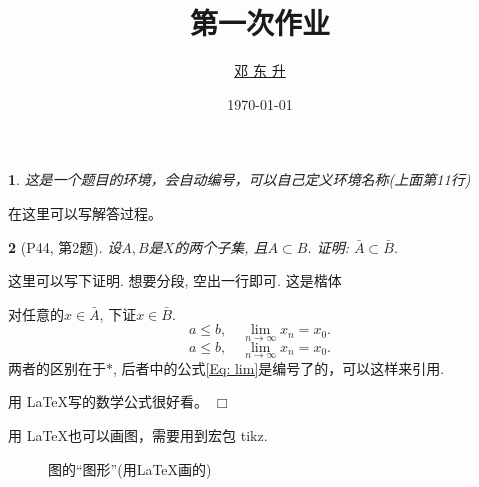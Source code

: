 \documentclass[lang=cn, 11pt]{elegantpaper}
\title{第一次作业}
\author{\href{https://ddswhu.me/}{邓 东 升}}
\date{\today}
\newtheorem{lizi}{\heiti }
\renewenvironment{proof}{\noindent{\heiti 证}\quad}{\quad \hfill$\Box$\vspace{2ex}}
\newcommand{\jieda}{\noindent{\heiti 解}\quad}
\begin{document}
\maketitle

\begin{lizi}
这是一个题目的环境，会自动编号，可以自己定义环境名称(上面第11行)
\end{lizi}
\jieda 在这里可以写解答过程。


\begin{lizi}[P44, 第2题]
设$A, B$是$X$的两个子集, 且$A\subset B$. 证明: $\bar{A}\subset\bar{B}$.
\end{lizi}
\begin{proof}
这里可以写下证明. 想要分段, 空出一行即可. {\kaishu 这是楷体}

对任意的$x\in\bar{A}$, 下证$x\in\bar{B}$.
\begin{equation*}
a\leq b, \quad \lim_{n\rightarrow\infty} x_n =x_0.
\end{equation*}
\begin{equation}\label{Eq: lim}
a\leq b, \quad \lim_{n\rightarrow\infty} x_n =x_0.
\end{equation}
两者的区别在于$*$, 后者中的公式\eqref{Eq: lim}是编号了的，可以这样来引用.

用 \LaTeX 写的数学公式很好看。
\end{proof}


用 \LaTeX 也可以画图，需要用到宏包 tikz.

\begin{figure}[htbp]
\begin{center}
\caption{图的“图形”(用\LaTeX 画的)}
\label{FigG}
\end{center}
\end{figure}
\end{document}
